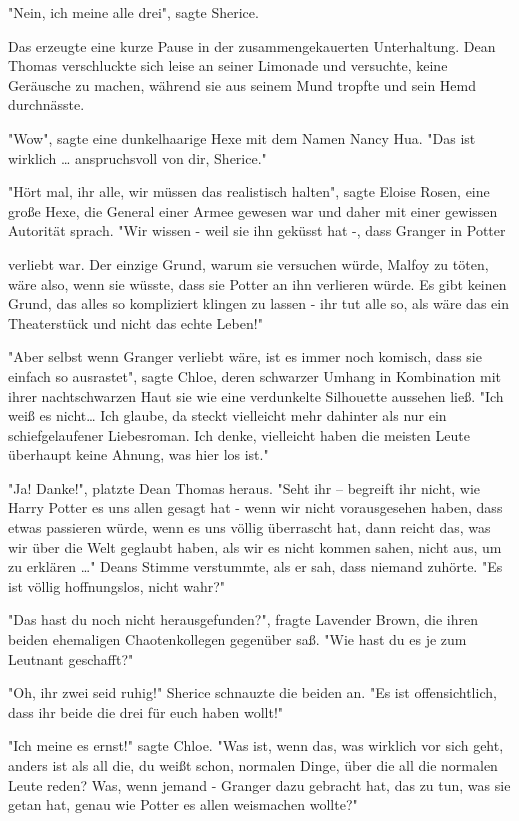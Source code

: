 {"Nein, ich meine alle drei", sagte Sherice.

Das erzeugte eine kurze Pause in der zusammengekauerten Unterhaltung. Dean Thomas verschluckte sich leise an seiner Limonade und versuchte, keine Geräusche zu machen, während sie aus seinem Mund tropfte und sein Hemd durchnässte.

"Wow", sagte eine dunkelhaarige Hexe mit dem Namen Nancy Hua. "Das ist wirklich … anspruchsvoll von dir, Sherice."

"Hört mal, ihr alle, wir müssen das realistisch halten", sagte Eloise Rosen, eine große Hexe, die General einer Armee gewesen war und daher mit einer gewissen Autorität sprach. "Wir wissen - weil sie ihn geküsst hat -, dass Granger in Potter

verliebt war. Der einzige Grund, warum sie versuchen würde, Malfoy zu töten, wäre also, wenn sie wüsste, dass sie Potter an ihn verlieren würde. Es gibt keinen Grund, das alles so kompliziert klingen zu lassen - ihr tut alle so, als wäre das ein Theaterstück und nicht das echte Leben!"

"Aber selbst wenn Granger verliebt wäre, ist es immer noch komisch, dass sie einfach so ausrastet", sagte Chloe, deren schwarzer Umhang in Kombination mit ihrer nachtschwarzen Haut sie wie eine verdunkelte Silhouette aussehen ließ. "Ich weiß es nicht… Ich glaube, da steckt vielleicht mehr dahinter als nur ein schiefgelaufener Liebesroman. Ich denke, vielleicht haben die meisten Leute überhaupt keine Ahnung, was hier los ist."

"Ja! Danke!", platzte Dean Thomas heraus. "Seht ihr -- begreift ihr nicht, wie Harry Potter es uns allen gesagt hat - wenn wir nicht vorausgesehen haben, dass etwas passieren würde, wenn es uns völlig überrascht hat, dann reicht das, was wir über die Welt geglaubt haben, als wir es nicht kommen sahen, nicht aus, um zu erklären …" Deans Stimme verstummte, als er sah, dass niemand zuhörte. "Es ist völlig hoffnungslos, nicht wahr?"

"Das hast du noch nicht herausgefunden?", fragte Lavender Brown, die ihren beiden ehemaligen Chaotenkollegen gegenüber saß. "Wie hast du es je zum Leutnant geschafft?"

"Oh, ihr zwei seid ruhig!" Sherice schnauzte die beiden an. "Es ist offensichtlich, dass ihr beide die drei für euch haben wollt!"

"Ich meine es ernst!" sagte Chloe. "Was ist, wenn das, was wirklich vor sich geht, anders ist als all die, du weißt schon, normalen Dinge, über die all die normalen Leute reden? Was, wenn jemand - Granger dazu gebracht hat, das zu tun, was sie getan hat, genau wie Potter es allen weismachen wollte?"

}
